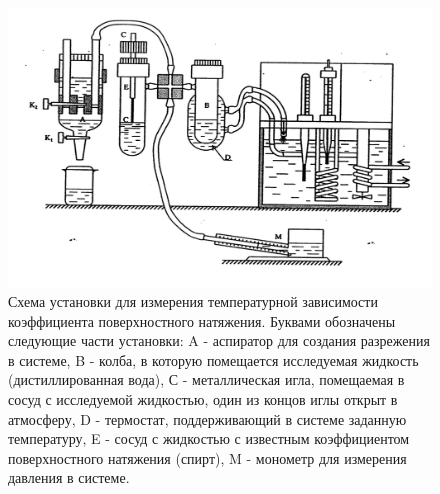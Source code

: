 \documentclass[a4paper,12pt]{report}
\begin{document}
\begin{multicols}{2}
\begin{figure}[H]
    \centering
    \includegraphics[width=0.7\linewidth]{img1.png}
    \caption{Схема установки для измерения температурной зависимости коэффициента поверхностного натяжения. Буквами обозначены
        следующие части установки: A - аспиратор для создания разрежения в системе, 
        B - колба, в которую помещается исследуемая жидкость (дистиллированная вода),
        С - металлическая игла, помещаемая в сосуд с исследуемой жидкостью, один из концов иглы открыт в атмосферу, 
        D - термостат, поддерживающий в системе заданную температуру, 
        E - сосуд с жидкостью с известным коэффициентом поверхностного натяжения (спирт),
        M - монометр для измерения давления в системе.}
    \label{fig:1}
\end{figure}

\end{multicols}
\end{document}
